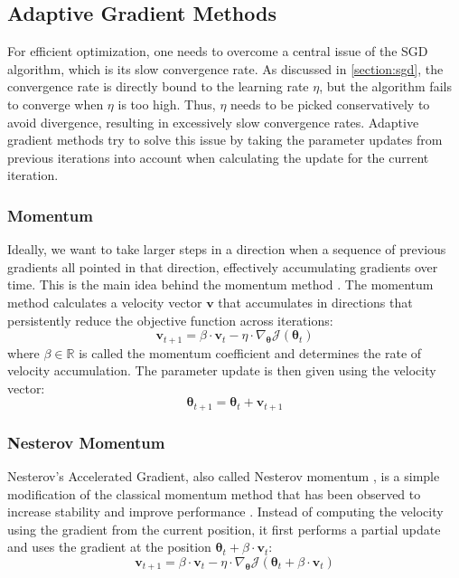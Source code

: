 \subsection{Adaptive Gradient Methods}
For efficient optimization, one needs to overcome 
a central issue of the \ac{SGD} algorithm, which is its 
slow convergence rate. As discussed in \autoref{section:sgd}, 
the convergence rate is directly bound to the learning rate $\eta$, 
but the algorithm fails to converge when $\eta$ is too high.
Thus, $\eta$ needs to be picked conservatively to avoid
divergence, resulting in excessively slow
convergence rates. Adaptive gradient methods try to solve
this issue by taking the parameter updates 
from previous iterations into account
when calculating the update 
for the current iteration. 

\subsubsection{Momentum}

Ideally, we want to take larger steps
in a direction when a sequence of previous 
gradients all pointed in that direction, effectively
accumulating gradients over time. This is the main idea
behind the momentum method \parencite{momentum-polyak}.
The momentum method calculates a velocity vector 
$\mathbf{v}$ that 
accumulates in directions that persistently reduce 
the objective function across iterations:
\begin{equation}
    \mathbf{v}_{t+1} = \beta \cdot \mathbf{v}_t - \eta \cdot \nabla_{\bm{\theta}}\mathcal{J}(\bm{\theta}_t)
\end{equation}
where $\beta \in \mathbb{R}$ is called the momentum coefficient and determines
the rate of velocity accumulation. The parameter update 
is then given using the velocity vector:
\begin{equation}
    \bm{\theta}_{t+1} = \bm{\theta}_t + \mathbf{v}_{t+1}
\end{equation}

\subsubsection{Nesterov Momentum}

Nesterov’s Accelerated Gradient, also called Nesterov 
momentum \parencite{nesterov}, is a simple modification of
the classical momentum method that has been observed to
increase stability and improve performance 
\parencite{momentum-sutskever}. Instead of computing 
the velocity using the gradient from the current
position, it first performs a partial update and uses the
gradient at the position $\bm{\theta}_t + \beta \cdot \mathbf{v}_t$:
\begin{equation}
    \mathbf{v}_{t+1} = \beta \cdot \mathbf{v}_t - \eta \cdot \nabla_{\bm{\theta}}\mathcal{J}(\bm{\theta}_t + \beta \cdot \mathbf{v}_t)
\end{equation}

